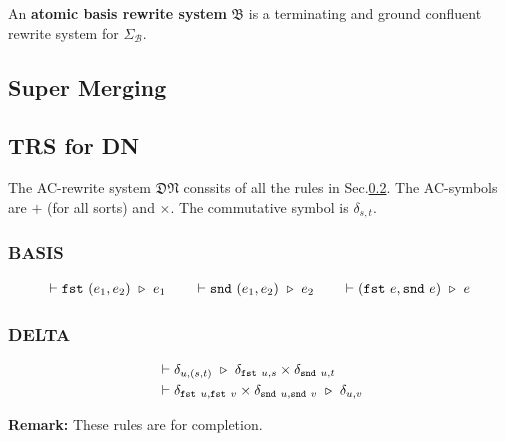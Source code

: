 \begin{definition}
  An \textbf{atomic basis rewrite system} $\mathfrak{B}$ is a terminating and ground confluent rewrite system for $\Sigma_\mathcal{B}$.
\end{definition}

\subsection{Super Merging}


\subsection{TRS for DN}
\label{sec: typed_dirac_rules}

\begin{definition} 
  The AC-rewrite system $\mathfrak{DN}$ conssits of all the rules in Sec.\ref{sec: typed_dirac_rules}.
  The AC-symbols are $+$ (for all sorts) and $\times$. The commutative symbol is $\delta_{s, t}$.
\end{definition}

\subsubsection*{\textsf{BASIS}}
\begin{align*}
    \vdash \texttt{fst}\ (e_1, e_2) \ \triangleright\  e_1
    \qquad
    \vdash \texttt{snd}\ (e_1, e_2) \ \triangleright\  e_2
    \qquad
    \vdash (\texttt{fst}\ e, \texttt{snd}\ e)\ \triangleright\  e
\end{align*}

\subsubsection*{\textsf{DELTA}}
\begin{align*}
  & \vdash \delta_{u, (s, t)} \ \triangleright\  \delta_{\texttt{fst}\ u, s} \times \delta_{\texttt{snd}\ u, t} \\
  & \vdash \delta_{\texttt{fst}\ u, \texttt{fst}\ v}\times\delta_{\texttt{snd}\ u, \texttt{snd}\ v} \ \triangleright\  \delta_{u, v}
\end{align*}

\textbf{Remark: } These rules are for completion.


